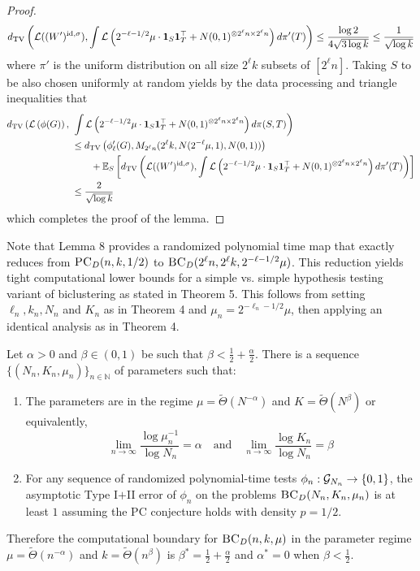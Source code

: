 \documentclass[11pt]{article}
\begin{document}
\begin{proof}
$$d_{\text{TV}}\left( \mathcal{L}((W')^{\text{id}, \sigma}), \int \mathcal{L}\left( 2^{-\ell-1/2} \mu \cdot \mathbf{1}_S \mathbf{1}_T^\top + N(0, 1)^{\otimes 2^\ell n \times 2^\ell n} \right) d\pi'(T) \right) \le \frac{\log 2}{4 \sqrt{3 \log k}} \le \frac{1}{\sqrt{\log k}}$$
where $\pi'$ is the uniform distribution on all size $2^\ell k$ subsets of $[2^\ell n]$. Taking $S$ to be also chosen uniformly at random yields by the data processing and triangle inequalities that
\begin{align*}
d_{\text{TV}}\left( \mathcal{L}\left( \phi(G) \right), \right. &\left. \int \mathcal{L}\left(2^{-\ell-1/2} \mu \cdot \mathbf{1}_S \mathbf{1}_T^\top + N(0, 1)^{\otimes 2^\ell n \times 2^\ell n} \right) d\pi(S, T) \right) \\
&\le d_{\text{TV}}\left( \phi_\ell'(G), M_{2^{\ell} n}(2^{\ell} k, N(2^{-\ell}\mu, 1), N(0, 1)) \right) \\
&\quad \quad + \mathbb{E}_S\left[d_{\text{TV}}\left( \mathcal{L}((W')^{\text{id}, \sigma}), \int \mathcal{L}\left( 2^{-\ell-1/2} \mu \cdot \mathbf{1}_S \mathbf{1}_T^\top + N(0, 1)^{\otimes 2^\ell n \times 2^\ell n} \right) d\pi'(T) \right) \right] \\
&\le \frac{2}{\sqrt{\log k}}
\end{align*}
which completes the proof of the lemma.
\end{proof}

Note that Lemma 8 provides a randomized polynomial time map that exactly reduces from $\textsc{PC}_D(n, k, 1/2)$ to $\textsc{BC}_D(2^\ell n, 2^\ell k, 2^{-\ell-1/2} \mu)$. This reduction yields tight computational lower bounds for a simple vs. simple hypothesis testing variant of biclustering as stated in Theorem 5. This follows from setting $\ell_n, k_n, N_n$ and $K_n$ as in Theorem 4 and $\mu_n = 2^{-\ell_n-1/2} \mu$, then applying an identical analysis as in Theorem 4.

\begin{theorem}
Let $\alpha > 0$ and $\beta \in (0, 1)$ be such that $\beta < \frac{1}{2} + \frac{\alpha}{2}$. There is a sequence $\{ (N_n, K_n, \mu_n) \}_{n \in \mathbb{N}}$ of parameters such that:
\begin{enumerate}
\item The parameters are in the regime $\mu = \tilde{\Theta}(N^{-\alpha})$ and $K = \tilde{\Theta}(N^\beta)$ or equivalently,
$$\lim_{n \to \infty} \frac{\log \mu_n^{-1}}{\log N_n} = \alpha \quad \text{and} \quad \lim_{n \to \infty} \frac{\log K_n}{\log N_n} = \beta$$
\item For any sequence of randomized polynomial-time tests $\phi_n : \mathcal{G}_{N_n} \to \{0, 1\}$, the asymptotic Type I$+$II error of $\phi_n$ on the problems $\textsc{BC}_D(N_n, K_n, \mu_n)$ is at least $1$ assuming the PC conjecture holds with density $p = 1/2$.
\end{enumerate}
Therefore the computational boundary for $\textsc{BC}_D(n, k, \mu)$ in the parameter regime $\mu = \tilde{\Theta}(n^{-\alpha})$ and $k = \tilde{\Theta}(n^\beta)$ is $\beta^* = \frac{1}{2} + \frac{\alpha}{2}$ and $\alpha^* = 0$ when $\beta < \frac{1}{2}$.
\end{theorem}
\end{document}
